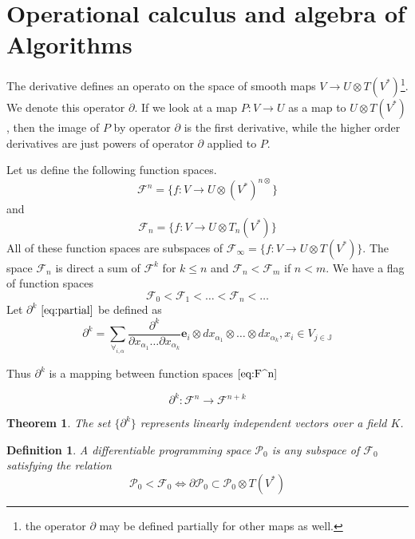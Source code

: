 \documentclass{article}
\newcommand{\JJ}{\mathbb{J}}
\newcommand{\e}{\mathbf{e}}
\newcommand{\F}{\mathcal{F}}
\newcommand{\dP}{\mathcal{P}}
\newcommand{\D}{\partial}
\newtheorem{definicija}{Definition}[section]
\newtheorem{izrek}{Theorem}[section]
\begin{document}
\section{Operational calculus and algebra of Algorithms}

The derivative defines an operato on the space of smooth maps $V\to U\otimes
 T(V^*)$\footnote{the operator $\D$ may be defined partially for other maps as
   well.}. We denote this operator $\D$. If we look at a map $P:V\to U$ as a map
 to $U\otimes T(V^*)$, then the image of $P$ by operator $\D$ is the first
 derivative, while the higher order derivatives are just powers of operator $\D$
 applied to $P$. 

Let us define the following function spaces.
 \begin{equation}\label{eq:F^n}
 	\F^n=\{f:V\to U\otimes(V^*)^{n\otimes}\}
 \end{equation}
 and
 \begin{equation}\label{eq:F_n}
 	\F_n=\{f:V\to U\otimes T_n(V^*)\}
 \end{equation}
All of these function spaces are subspaces of $\F_\infty=\{f:V\to U\otimes
T(V^*)\}$. The space $\F_n$ is direct a sum of $\F^k$ for $k\le n$ and $\F_n<\F_m$ if $n<m$. We
have a flag of function spaces
\begin{equation}
  \label{eq:flag_function_space}
  \F_0<\F_1<\ldots<\F_n<\ldots
\end{equation}
Let $\D^k$ $\eqref{eq:partial}$ be defined as
\begin{equation}\label{eq:dd}
	\partial^k=\sum_{\forall_{i,\alpha}}\frac{\partial^k}{\partial
	    x_{\alpha_1}\ldots \partial x_{\alpha_k}}\e_i\otimes
	  dx_{\alpha_1}\otimes\ldots \otimes dx_{\alpha_k} , x_i\in V_{j\in\JJ}
\end{equation}

Thus $\D^k$ is a mapping between function spaces $\eqref{eq:F^n}$
 
 \begin{equation}\label{eq:toFn+k}
 \D^k:\F^n\to\F^{n+k}
 \end{equation}
 
 \begin{izrek}\label{izr:linearnaNeodvisnost}
  The set $\{\partial^k\}$ represents linearly independent vectors over a field $K$.
 \end{izrek}
 
 \begin{definicija}\label{def:dP}
 	A differentiable programming space $\dP_0$ is any subspace of $\F_0$ satisfying the relation
 	\begin{equation}\label{eq:P}
 	\dP_0<\F_0\iff\D\dP_0\subset\dP_0\otimes T(V^*)
 	\end{equation}
 \end{definicija}
\end{document}
